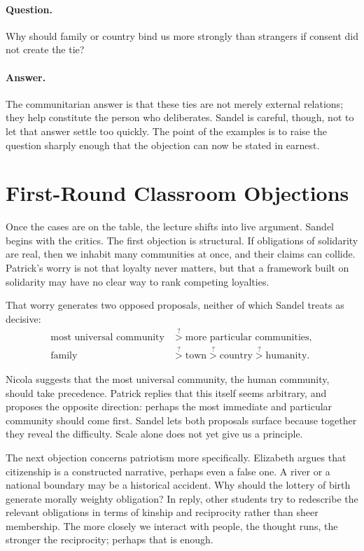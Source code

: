 \paragraph{Question.} Why should family or country bind us more strongly than strangers if consent did not create the tie?

\paragraph{Answer.} The communitarian answer is that these ties are not merely external relations; they help constitute the person who deliberates. Sandel is careful, though, not to let that answer settle too quickly. The point of the examples is to raise the question sharply enough that the objection can now be stated in earnest.

\section{First-Round Classroom Objections}

Once the cases are on the table, the lecture shifts into live argument. Sandel begins with the critics. The first objection is structural. If obligations of solidarity are real, then we inhabit many communities at once, and their claims can collide. Patrick's worry is not that loyalty never matters, but that a framework built on solidarity may have no clear way to rank competing loyalties.

That worry generates two opposed proposals, neither of which Sandel treats as decisive:
\begin{align}
\text{most universal community} &\stackrel{?}{>} \text{more particular communities}, \\
\text{family} &\stackrel{?}{>} \text{town} \stackrel{?}{>} \text{country} \stackrel{?}{>} \text{humanity}.
\end{align}

Nicola suggests that the most universal community, the human community, should take precedence. Patrick replies that this itself seems arbitrary, and proposes the opposite direction: perhaps the most immediate and particular community should come first. Sandel lets both proposals surface because together they reveal the difficulty. Scale alone does not yet give us a principle.

The next objection concerns patriotism more specifically. Elizabeth argues that citizenship is a constructed narrative, perhaps even a false one. A river or a national boundary may be a historical accident. Why should the lottery of birth generate morally weighty obligation? In reply, other students try to redescribe the relevant obligations in terms of kinship and reciprocity rather than sheer membership. The more closely we interact with people, the thought runs, the stronger the reciprocity; perhaps that is enough.

